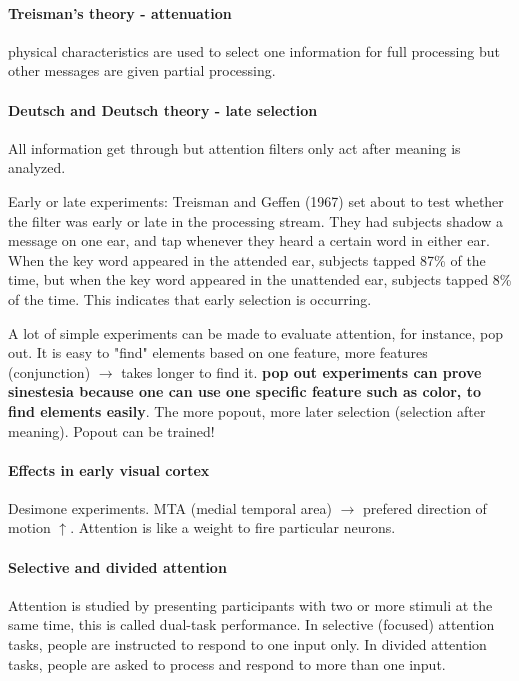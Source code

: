 \documentclass[12pt,article,oneside,a4paper]{memoir}
\begin{document}
\paragraph{Treisman's theory - attenuation} physical characteristics are used to select one information for full processing but other messages are given partial processing. 

\paragraph{Deutsch and Deutsch theory - late selection} All information get through but attention filters only act after meaning is analyzed. 

Early or late experiments: Treisman and Geffen (1967) set about to test whether the filter was early or late in the processing stream. They had subjects shadow a message on one ear, and tap whenever they heard a certain word in either ear. When the key word appeared in the attended ear, subjects tapped 87\% of the time, but when the key word appeared in the unattended ear, subjects tapped 8\% of the time. This indicates that early selection is occurring.

A lot of simple experiments can be made to evaluate attention, for instance, pop out. It is easy to "find" elements based on one feature, more features (conjunction) $\rightarrow$ takes longer to find it. \textbf{pop out experiments can prove sinestesia because one can use one specific feature such as color, to find elements easily}. The more popout, more later selection (selection after meaning). Popout can be trained!

\paragraph{Effects in early visual cortex} Desimone experiments. MTA (medial temporal area) $\rightarrow$ prefered direction of motion $\uparrow$. Attention is like a weight to fire particular neurons.

\paragraph{Selective and divided attention} Attention is studied by presenting participants with two or more stimuli at the same time, this is called dual-task performance. In selective (focused) attention tasks, people are instructed to respond to one input only. In divided attention tasks, people are asked to process and respond to more than one input.
\end{document}
